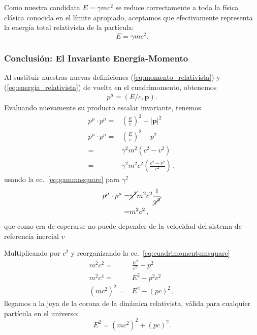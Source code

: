 \documentclass[11pt,a4paper]{book}
\begin{document}
Como nuestra candidata $E=\gamma mc^2$ se reduce correctamente a toda la física
clásica conocida en el límite apropiado, aceptamos que efectivamente representa la
energía total relativista de la partícula:
\begin{equation}
    E = \gamma mc^2 .
\end{equation}



\subsubsection{Conclusión: El Invariante Energía-Momento}

Al sustituir nuestras nuevas definiciones (\ref{eq:momento_relativista}) y (\ref{eq:energia_relativista}) de vuelta en el cuadrimomento, obtenemos 
\begin{align}
p^\mu = (E/c, \boldsymbol{p}).     
\end{align}
Evaluando nuevamente su producto escalar invariante, tenemos
\begin{align}
\label{eq:cuadrimomentumsquare}
    p^\mu \cdot p^\mu =&\left( \frac{E}{c} \right)^2 - |\boldsymbol{p}|^2\nonumber\\
    p^\mu \cdot p^\mu =&\left( \frac{E}{c} \right)^2 - p^2\\
    =& \gamma^2m^2\left(c^2-v^2\right)\nonumber\\
    =& \gamma^2m^2 c^2\left(\frac{c^2-v^2}{c^2}\right)\nonumber\,,
\end{align}
usando la ec.~\eqref{eq:gammasquare} para $\gamma^2$
\begin{align}
p^\mu \cdot p^\mu =&\cancel{\gamma^2} m^2 c^2\frac{1}{\cancel{\gamma^2}}\nonumber\\
    =& m^2 c^2\,,    
\end{align}
que como era de esperarse no puede depender de la velocidad del sistema de referencia inercial $v$

Multiplicando por $c^2$ y reorganizando la ec.~\eqref{eq:cuadrimomentumsquare}
\begin{align*}
m^2c^2 =& \frac{E^2}{c^2} - p^2 \\
m^2c^4 =& E^2 - p^2 c^2\\
\left(m c^2\right)^2 =& E^2 - \left(p c\right)^2\,,
\end{align*}
llegamos a la joya de la corona de la dinámica relativista, válida para cualquier partícula en el universo:
\begin{equation}
\label{eq:energiarelativista}
    E^2 = (m c^2)^2 + (p c)^2.
\end{equation}
\end{document}
